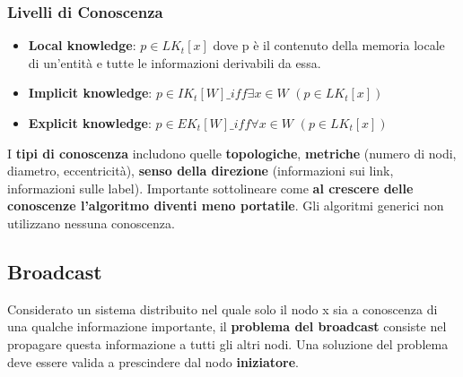 \documentclass[12pt]{article}
\begin{document}
	\subsubsection{Livelli di Conoscenza}
		\begin{itemize}
			\item \textbf{Local knowledge}: $p \in LK_t[x]$ dove p è il contenuto della memoria locale di un'entità e tutte le informazioni derivabili da essa.
			\item \textbf{Implicit knowledge}: $p \in IK_t[W]\_ iff \exists x \in W$ $(p \in LK_t[x])$
			\item \textbf{Explicit knowledge}: $p \in EK_t[W]\_ iff \forall x \in W$ $(p \in LK_t[x])$
		\end{itemize}
		I \textbf{tipi di conoscenza} includono quelle \textbf{topologiche}, \textbf{metriche} (numero di nodi, diametro, eccentricità), \textbf{senso della direzione} (informazioni sui link, informazioni sulle label). Importante sottolineare come \textbf{al crescere delle conoscenze l'algoritmo diventi meno portatile}. Gli algoritmi generici non utilizzano nessuna conoscenza.     
	
	\subsection{Broadcast}
		Considerato un sistema distribuito nel quale solo il nodo x sia a conoscenza di una qualche informazione importante, il \textbf{problema del broadcast} consiste nel propagare questa informazione a tutti gli altri nodi. Una soluzione del problema deve essere valida a prescindere dal nodo \textbf{iniziatore}.
		
\end{document}
